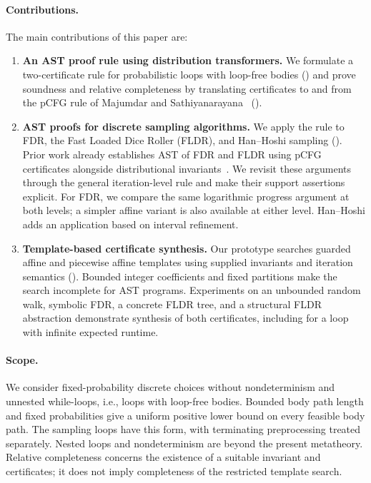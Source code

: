\paragraph{Contributions.}
The main contributions of this paper are:
\begin{enumerate}
\item \textbf{An AST proof rule using distribution transformers.}
We formulate a two-certificate rule for probabilistic loops with loop-free
bodies () and prove soundness and relative completeness
by translating certificates to and from the pCFG rule of Majumdar and
Sathiyanarayana~\cite{DBLP:journals/pacmpl/MajumdarS25}
().

\item \textbf{AST proofs for discrete sampling algorithms.}
We apply the rule to FDR, the Fast Loaded Dice Roller (FLDR), and
Han--Hoshi sampling
(). Prior work already establishes AST of FDR
and FLDR using pCFG certificates alongside distributional
invariants~\cite{zilken2026verifyingsamplingalgorithmsdistributional}.
We revisit these arguments through the general iteration-level rule
and make their support assertions explicit. For FDR, we compare the
same logarithmic progress argument at both levels; a simpler affine
variant is also available at either level. Han--Hoshi adds an application
based on interval refinement.

\item \textbf{Template-based certificate synthesis.}
Our prototype searches guarded affine and piecewise affine templates
using supplied invariants and iteration semantics
(). Bounded integer coefficients and
fixed partitions make the search incomplete for AST programs.
Experiments on an unbounded random walk, symbolic FDR, a concrete FLDR
tree, and a structural FLDR abstraction demonstrate synthesis of both
certificates, including for a loop with infinite expected runtime.
\end{enumerate}

\paragraph{Scope.}
We consider fixed-probability discrete choices without nondeterminism
and unnested while-loops, i.e., loops with loop-free bodies. Bounded body
path length and fixed probabilities give a uniform positive lower bound
on every feasible body path. The sampling loops have this form, with
terminating preprocessing treated separately. Nested loops and
nondeterminism are beyond the present metatheory. Relative completeness
concerns the existence of a suitable invariant and certificates; it does
not imply completeness of the restricted template search.

